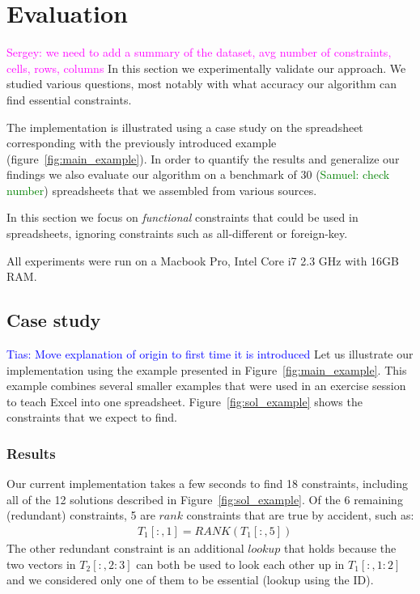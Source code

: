 \documentclass{sig-alternate-05-2015}
\newcommand{\sergey}[1]{\textcolor{magenta}{{\sc Sergey:} #1}\xspace}
\newcommand{\samuel}[1]{\textcolor{green}{{\sc Samuel:} #1}\xspace}
\newcommand{\tias}[1]{\textcolor{blue}{{\sc Tias:} #1}\xspace}
\newcommand{\range}[3]{\ensuremath{#1[#2,#3]}}
\newcommand{\rangeto}[2]{#1{:}#2}
\newcommand{\rangeall}{:}
\newcommand{\eccalc}[2]{\ensuremath{#1 = #2}}
\newcommand{\ecrank}[2]{\eccalc{#1}{\textit{RANK}(#2)}}
\begin{document}

\newcommand{\runtotal}{16.12}
\newcommand{\runtotalstd}{0.62}

\newcommand{\runfile}{0.50}
\newcommand{\runfilestd}{0.02}

\section{Evaluation}\label{sec:evaluation}
\sergey{we need to add a summary of the dataset, avg number of constraints, cells, rows, columns}
In this section we experimentally validate our approach.
We studied various questions, most notably with what accuracy our algorithm can find essential constraints.

The implementation is illustrated using a case study on the spreadsheet corresponding with the previously introduced example (figure~\ref{fig:main_example}).
In order to quantify the results and generalize our findings we also evaluate our algorithm on a benchmark of 30 (\samuel{check number}) spreadsheets that we assembled from various sources.

In this section we focus on \textit{functional} constraints that could be used in spreadsheets, ignoring constraints such as all-different or foreign-key.

All experiments were run on a Macbook Pro, Intel Core i7 2.3 GHz with 16GB RAM.

\subsection{Case study}
\tias{Move explanation of origin to first time it is introduced}
Let us illustrate our implementation using the example presented in Figure~\ref{fig:main_example}.
This example combines several smaller examples that were used in an exercise session to teach Excel into one spreadsheet.
Figure~\ref{fig:sol_example} shows the constraints that we expect to find.

\subsubsection{Results}
Our current implementation takes a few seconds to find 18 constraints, including all of the 12 solutions described in Figure~\ref{fig:sol_example}.
Of the 6 remaining (redundant) constraints, 5 are $\mathit{rank}$ constraints that are true by accident, such as: \begin{align*}
  & \ecrank{\range{T_1}{\rangeall}{1}}{\range{T_1}{\rangeall}{5}}
\end{align*}
The other redundant constraint is an additional $\mathit{lookup}$ that holds because the two vectors in \range{T_2}{\rangeall}{\rangeto{2}{3}} can both be used to look each other up in \range{T_1}{\rangeall}{\rangeto{1}{2}} and we considered only one of them to be essential (lookup using the ID).
\end{document}
